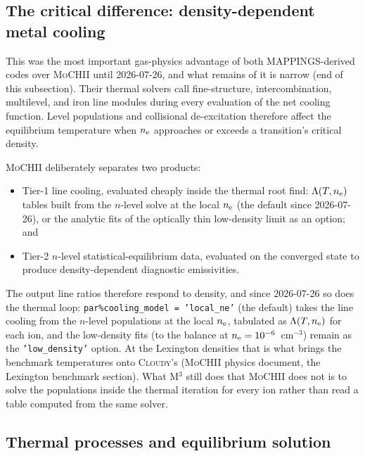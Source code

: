 \documentclass[english,a4paper]{my_memo}
\newcommand{\code}[1]{\texttt{#1}}
\newcommand{\MoCHII}{\textsc{MoCHII}}
\newcommand{\Mthree}{M$^3$}
\newcommand{\nelec}{n_{\rm e}}
\begin{document}
\subsection{The critical difference: density-dependent metal cooling}
\label{sec:densitycool}

This was the most important gas-physics advantage of both MAPPINGS-derived
codes over \MoCHII{} until 2026-07-26, and what remains of it is narrow (end of
this subsection).  Their thermal solvers call fine-structure,
intercombination, multilevel, and iron line
modules during every evaluation of the net cooling function.  Level
populations and collisional de-excitation therefore affect the equilibrium
temperature when $\nelec$ approaches or exceeds a transition's critical
density.

\MoCHII{} deliberately separates two products:

\begin{itemize}[leftmargin=2em]
\item Tier-1 line cooling, evaluated cheaply inside the thermal root find:
  $\Lambda(T, \nelec)$ tables built from the $n$-level solve at the local
  $\nelec$ (the default since 2026-07-26), or the analytic fits of the
  optically thin low-density limit as an option; and
\item Tier-2 $n$-level statistical-equilibrium data, evaluated on the
  converged state to produce density-dependent diagnostic emissivities.
\end{itemize}

The output line ratios therefore respond to density, and since 2026-07-26
so does the thermal loop: \code{par\%cooling\_model = 'local\_ne'} (the
default) takes the line cooling from the $n$-level populations at the local
$\nelec$, tabulated as $\Lambda(T, \nelec)$ for each ion, and the
low-density fits (to the balance at $\nelec = 10^{-6}$~cm$^{-3}$) remain as
the \code{'low\_density'} option.  At the
Lexington densities that is what brings the benchmark temperatures onto
\textsc{Cloudy}'s (\MoCHII{} physics document, the Lexington benchmark
section).  What \Mthree{} still does that \MoCHII{} does not is to solve the
populations inside the thermal iteration for every ion rather than read a
table computed from the same solver.

\subsection{Thermal processes and equilibrium solution}
\end{document}
